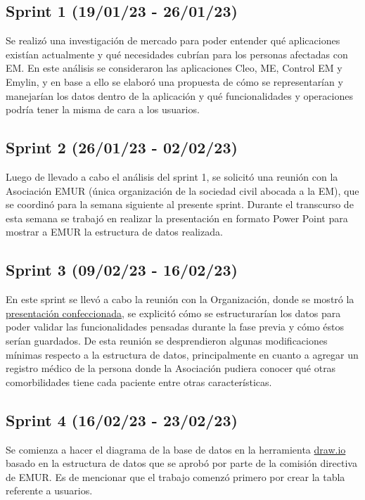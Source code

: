 \subsection{Sprint 1 (19/01/23 - 26/01/23)}\label{sprint-0-190123---260123}
Se realizó una investigación de mercado para poder entender qué aplicaciones existían actualmente y qué necesidades cubrían para los personas afectadas con EM. En este análisis se consideraron las aplicaciones Cleo, ME, Control EM y Emylin, y en base a ello se elaboró una propuesta de cómo se representarían y manejarían los datos dentro de la aplicación y qué funcionalidades y operaciones podría tener la misma de cara a los usuarios.

\subsection{Sprint 2 (26/01/23 - 02/02/23)}\label{sprint-0-190123---020223}
Luego de llevado a cabo el análisis del sprint 1, se solicitó una reunión con la Asociación EMUR (única organización de la sociedad civil abocada a la EM), que se coordinó para la semana siguiente al presente sprint. Durante el transcurso de esta semana se trabajó en realizar la presentación en formato Power Point para mostrar a EMUR la estructura de datos realizada.

\subsection{Sprint 3 (09/02/23 - 16/02/23)}\label{sprint-0-090223---160223}
En este sprint se llevó a cabo la reunión con la Organización, donde se mostró la  \href{https://www.dropbox.com/scl/fi/w0ks6nw8b2dslr4br24gp/TFG-Presentacion-EMUR.pptx?dl=0&rlkey=p7cyihykf6o1vnc2bfdkuhael}{presentación confeccionada}, se explicitó cómo se estructurarían los datos para poder validar las funcionalidades pensadas durante la fase previa y cómo éstos serían guardados.
De esta reunión se desprendieron algunas modificaciones mínimas respecto a la estructura de datos, principalmente en cuanto a agregar un registro médico de la persona donde la Asociación pudiera conocer qué otras comorbilidades tiene cada paciente entre otras características.

\subsection{Sprint 4 (16/02/23 - 23/02/23)}\label{sprint-0-090223---23022023}
Se comienza a hacer el diagrama de la base de datos en la herramienta \href{https://drive.google.com/file/d/1h34iN2JwS4Tcr9MRbupvjsVVfN3LC1cf/view?usp=sharing}{draw.io} basado en la estructura de datos que se aprobó por parte de la comisión directiva de EMUR. Es de mencionar que el trabajo comenzó primero por crear la tabla referente a usuarios.

